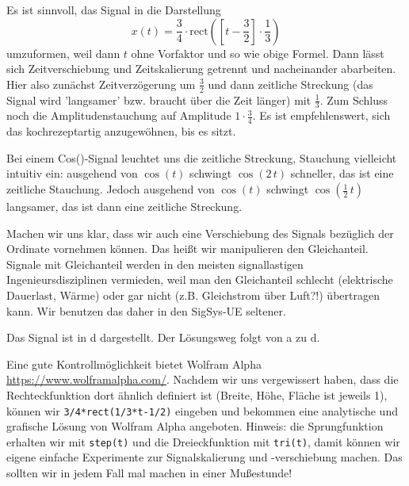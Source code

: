 \begin{Ansatz}
Es ist sinnvoll, das Signal in die Darstellung
\begin{equation}
x(t) = \frac{3}{4} \cdot \mathrm{rect}(\left[t-\frac{3}{2}\right]\cdot \frac{1}{3})
\end{equation}
umzuformen, weil dann $t$ ohne Vorfaktor und so wie obige Formel.
Dann lässt sich Zeitverschiebung und Zeitskalierung
getrennt und nacheinander abarbeiten. Hier also zunächst Zeitverzögerung um
$\frac{3}{2}$ und dann zeitliche Streckung (das Signal wird 'langsamer' bzw.
braucht über die Zeit länger) mit $\frac{1}{3}$.
%
Zum Schluss noch die Amplitudenstauchung auf Amplitude $1 \cdot \frac{3}{4}$.
%
Es ist empfehlenswert, sich das kochrezeptartig anzugewöhnen, bis es sitzt.

Bei einem Cos()-Signal leuchtet uns die zeitliche Streckung, Stauchung vielleicht
intuitiv ein: ausgehend von $\cos(t)$ schwingt $\cos(2\,t)$ schneller, das ist eine
zeitliche Stauchung.
%
Jedoch ausgehend von $\cos(t)$ schwingt $\cos(\frac{1}{2}\,t)$
langsamer, das ist dann eine zeitliche Streckung.

Machen wir uns klar, dass wir auch eine Verschiebung des Signals bezüglich der
Ordinate vornehmen können. Das heißt wir manipulieren den Gleichanteil.
%
Signale mit Gleichanteil werden in den meisten signallastigen
Ingenieursdisziplinen vermieden, weil man den Gleichanteil schlecht
(elektrische Dauerlast, Wärme) oder gar nicht (z.B. Gleichstrom über Luft?!)
übertragen kann.
%
Wir benutzen das daher in den SigSys-UE seltener.

\end{Ansatz}
\begin{Loesung}
Das Signal ist in d dargestellt. Der Lösungsweg folgt von
a zu d.

Eine gute Kontrollmöglichkeit bietet Wolfram Alpha
\url{https://www.wolframalpha.com/}.
Nachdem wir uns vergewissert haben, dass die Rechteckfunktion dort ähnlich definiert
ist (Breite, Höhe, Fläche ist jeweils 1), können wir
\verb|3/4*rect(1/3*t-1/2)| eingeben und bekommen eine analytische und grafische
Lösung von Wolfram Alpha angeboten.
Hinweis: die Sprungfunktion erhalten wir mit \verb|step(t)|
und die Dreieckfunktion mit \verb|tri(t)|, damit können wir eigene einfache
Experimente zur Signalskalierung und -verschiebung machen.
%
Das sollten wir in jedem Fall mal machen in einer Mußestunde!

\end{Loesung}

